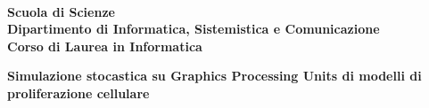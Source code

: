 \documentclass[11pt, a4paper, oneside]{Thesis} %
\title{\ttitle} %
\begin{document}
% 

\begin{titlepage}
	
	\noindent
	\begin{minipage}[t]{0.18\textwidth}
	\end{minipage}
	\begin{minipage}[t]{0.82\textwidth}
		{
			 \\
			\textbf{Scuola di Scienze} \\
			\textbf{Dipartimento di Informatica, Sistemistica e Comunicazione} \\
			\textbf{Corso di Laurea in Informatica} \\
			\par
		}
	\end{minipage}
	
	\vspace{40mm}
	
	\begin{center}
		{\LARGE{
				\textbf{Simulazione stocastica su Graphics Processing
                Units di modelli di proliferazione cellulare}
				\par
		}}
	\end{center}
	

\end{titlepage}
\end{document}

